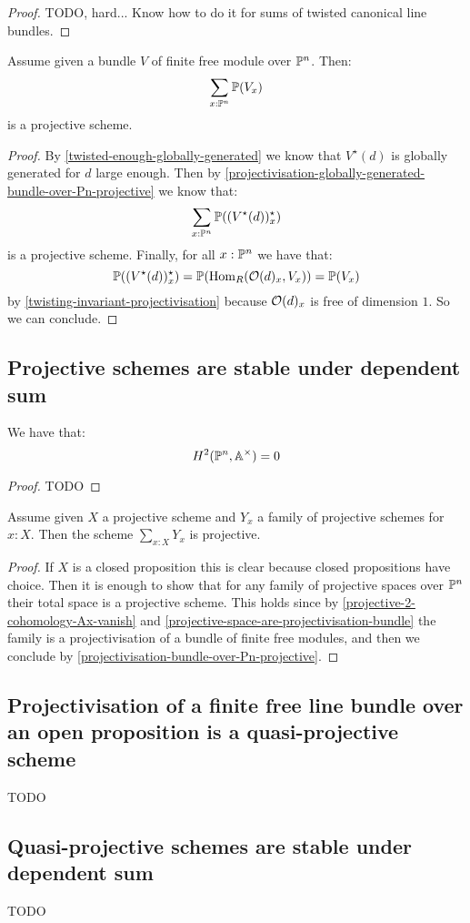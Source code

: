 \begin{proof}
TODO, hard... Know how to do it for sums of twisted canonical line bundles.
\end{proof}

\begin{lemma}\label{projectivisation-bundle-over-Pn-projective}
Assume given a bundle $V$ of finite free module over $\mathbb{P}^n$. Then:
\[\sum_{x:\mathbb{P}^n}\mathbb{P}(V_x)\]
is a projective scheme.
\end{lemma}

\begin{proof}
By \cref{twisted-enough-globally-generated} we know that $V^\star(d)$ is globally generated for $d$ large enough. Then by \cref{projectivisation-globally-generated-bundle-over-Pn-projective} we know that:
\[\sum_{x:\mathbb{P}^n}\mathbb{P}((V^\star(d))^\star_x)\] 
is a projective scheme. Finally, for all $x:\mathbb{P}^n$ we have that:
\[\mathbb{P}((V^\star(d))^\star_x) = \mathbb{P}(\mathrm{Hom}_R(\mathcal{O}(d)_x,V_x)) = \mathbb{P}(V_x)\]
by \cref{twisting-invariant-projectivisation} because $\mathcal{O}(d)_x$ is free of dimension $1$. So we can conclude.
\end{proof}

\subsection{Projective schemes are stable under dependent sum}

\begin{lemma}\label{projective-2-cohomology-Ax-vanish}
We have that:
\[H^2(\mathbb{P}^n,\mathbb{A}^\times) = 0\]
\end{lemma}

\begin{proof}
TODO
\end{proof}

\begin{proposition}
Assume given $X$ a projective scheme and $Y_x$ a family of projective schemes for $x:X$. Then the scheme $\sum_{x:X}Y_x$ is projective.
\end{proposition}

\begin{proof}
If $X$ is a closed proposition this is clear because closed propositions have choice. Then it is enough to show that for any family of projective spaces over $\mathbb{P}^n$ their total space is a projective scheme. This holds since by \cref{projective-2-cohomology-Ax-vanish} and \cref{projective-space-are-projectivisation-bundle} the family is a projectivisation of a bundle of finite free modules, and then we conclude by \cref{projectivisation-bundle-over-Pn-projective}.
\end{proof}

\subsection{Projectivisation of a finite free line bundle over an open proposition is a quasi-projective scheme}

TODO

\subsection{Quasi-projective schemes are stable under dependent sum}

TODO
